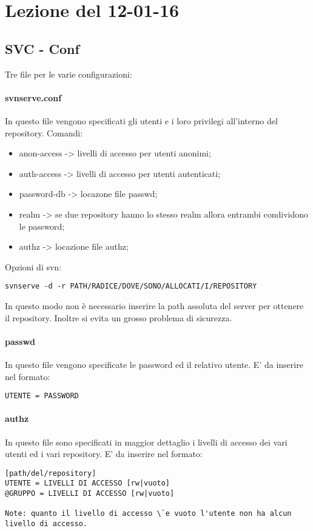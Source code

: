 \section{Lezione del 12-01-16}
\subsection{SVC - Conf}
Tre file per le varie configurazioni:
\paragraph*{svnserve.conf}
In questo file vengono specificati gli utenti e i loro privilegi all'interno del repository. Comandi:
\begin{itemize}
\item anon-access -> livelli di accesso per utenti anonimi;
\item auth-access -> livelli di accesso per utenti autenticati;
\item password-db -> locazone file passwd;
\item realm -> se due repository hanno lo stesso realm allora entrambi condividono le password;
\item authz -> locazione file authz;
\end{itemize}
Opzioni di svn:
\begin{verbatim}
svnserve -d -r PATH/RADICE/DOVE/SONO/ALLOCATI/I/REPOSITORY
\end{verbatim}
In questo modo non \`e necessario inserire la path assoluta del server per ottenere il repository. Inoltre si evita un grosso problema di sicurezza. 


\paragraph*{passwd}
In questo file vengono specificate le password ed il relativo utente. E' da inserire nel formato: \newline
\begin{verbatim}
UTENTE = PASSWORD
\end{verbatim}

\paragraph*{authz}
In questo file sono specificati in maggior dettaglio i livelli di accesso dei vari utenti ed i vari repository. \newline
E' da inserire nel formato: \newline
\begin{verbatim}
[path/del/repository]
UTENTE = LIVELLI DI ACCESSO [rw|vuoto]
@GRUPPO = LIVELLI DI ACCESSO [rw|vuoto]

Note: quanto il livello di accesso \`e vuoto l'utente non ha alcun livello di accesso.
\end{verbatim}


